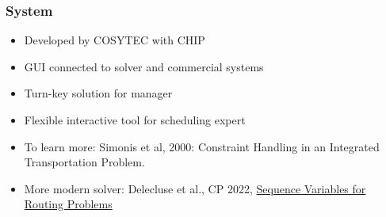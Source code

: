 \begin{frame}
\frametitle{System}
\begin{itemize}
\item Developed by COSYTEC with CHIP
\item GUI connected to solver and commercial systems
\item Turn-key solution for manager
\item Flexible interactive tool for scheduling expert
\item To learn more: Simonis et al, 2000: Constraint Handling in an Integrated Transportation Problem.
\item More modern solver: Delecluse et al., CP 2022, \href{https://drops.dagstuhl.de/entities/document/10.4230/LIPIcs.CP.2022.19}{Sequence Variables for Routing Problems}

\end{itemize}
\end{frame}

